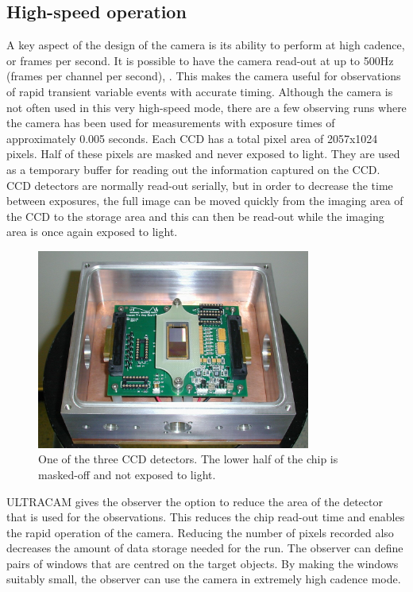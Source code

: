 \subsection{High-speed operation}
A key aspect of the design of the camera is its ability to perform at high cadence, or frames per second. It is possible to have the camera read-out at up to 500Hz (frames per channel per second), \citep{dhillon07}. This makes the camera useful for observations of rapid transient variable events with accurate timing. Although the camera is not often used in this very high-speed mode, there are a few observing runs where the camera has been used for measurements with exposure times of approximately 0.005 seconds. Each CCD has a total pixel area of 2057x1024 pixels. Half of these pixels are masked and never exposed to light. They are used as a temporary buffer for reading out the information captured on the CCD. CCD detectors are normally read-out serially, but in order to decrease the time between exposures, the full image can be moved quickly from the imaging area of the CCD to the storage area and this can then be read-out while the imaging area is once again exposed to light. 

\begin{figure}
\centering
\includegraphics[width=90mm]{images/ccd.png}
\caption{One of the three CCD detectors. The lower half of the chip is masked-off and not exposed to light.}
\label{fig2}
\end{figure}

ULTRACAM gives the observer the option to reduce the area of the detector that is used for the observations. This reduces the chip read-out time and enables the rapid operation of the camera. Reducing the number of pixels recorded also decreases the amount of data storage needed for the run. The observer can define pairs of windows that are centred on the target objects. By making the windows suitably small, the observer can use the camera in extremely high cadence mode. 

